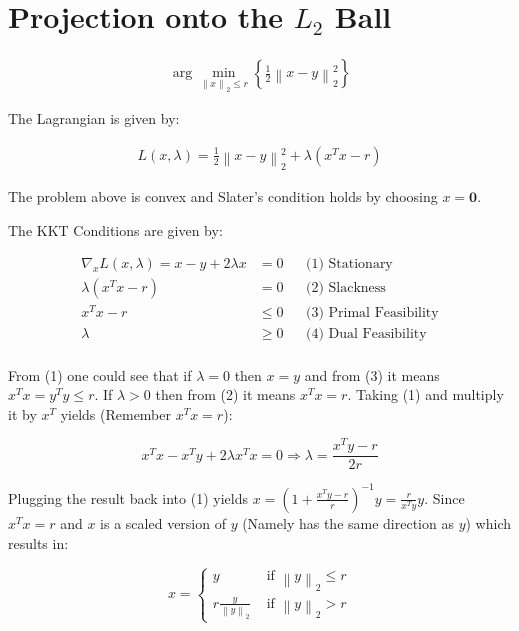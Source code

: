 \documentclass[]{article}
\newcommand{\MyParen}[1]{\left( #1 \right)}
\newcommand{\MyBrace}[1]{\left\lbrace #1 \right\rbrace}
\newcommand{\MyNorm}[2]{{\left\| #1 \right\|}_{#2}}
\newcommand{\MyNormSqr}[2]{{\left\| #1 \right\|}_{#2}^{2}}
\newcommand{\MyNormTwo}[1]{\MyNorm{#1}{2}}
\newcommand{\MyNormTwoSqr}[1]{\MyNormSqr{#1}{2}}
\begin{document}
	\section{Projection onto the $ {L}_{2} $ Ball}
	
	\begin{align*}
		\arg \min_{ \MyNormTwo{x} \leq r } \MyBrace{ \frac{1}{2} \MyNormTwoSqr{ x - y } }
	\end{align*}
	
	The Lagrangian is given by:
	
	\begin{align*}
	L \MyParen{x, \lambda} = \frac{1}{2} \MyNormTwoSqr{ x - y } + \lambda \MyParen{ {x}^{T} x - r }
	\end{align*}
	
	The problem above is convex and Slater's condition holds by choosing $ x = \boldsymbol{0} $.
	
	The KKT Conditions are given by:
	
	\begin{align*}
	{\nabla}_{x} L \MyParen{ x, \lambda } = x - y + 2 \lambda x & = 0 && \text{(1) Stationary} \\
	\lambda \MyParen{ {x}^{T} x  - r} 	& = 0 		&& \text{(2) Slackness} \\
	{x}^{T} x  - r						& \leq 0 	&& \text{(3) Primal Feasibility} \\
	\lambda 							& \geq 0 	&& \text{(4) Dual Feasibility} \\
	\end{align*}
	
	From (1) one could see that if $ \lambda = 0 $ then $ x = y $ and from (3) it means $ {x}^{T} x = {y}^{T} y \leq r $. If $ \lambda > 0 $ then from (2) it means $ {x}^{T} x = r $.
	Taking (1) and multiply it by $ {x}^{T} $ yields (Remember $ {x}^{T} x = r $):
	
	$$ {x}^{T} x - {x}^{T} y + 2 \lambda {x}^{T} x = 0 \Rightarrow \lambda = \frac{ {x}^{T} y - r }{2 r} $$
	
	Plugging the result back into (1) yields $ x = \MyParen{1 + \frac{{x}^{T} y - r}{r}}^{-1} y = \frac{r}{ {x}^{T} y } y $. Since $ {x}^{T} x = r $ and $ x $ is a scaled version of $ y $ (Namely has the same direction as $ y $) which results in:
	
	$$ x = \begin{cases}
	y 							& \text{ if } \MyNormTwo{y} \leq r \\ 
	r \frac{y}{\MyNormTwo{y}} 	& \text{ if } \MyNormTwo{y} > r 
	\end{cases} $$
	
\end{document}
